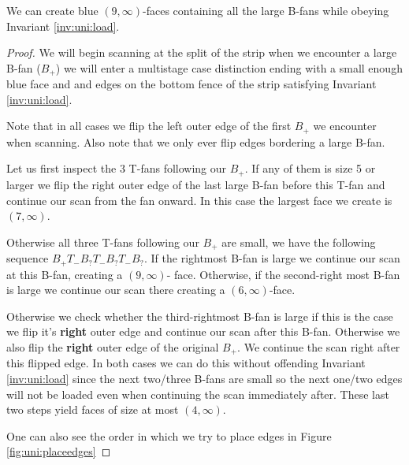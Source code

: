 \begin{lemma}
  \label{lm:uni:removingLargeB-fans}
  We can create blue $(9, \infty)$-faces containing all the large B-fans while obeying Invariant \ref{inv:uni:load}.
\end{lemma}


\begin{proof}
  We will begin scanning at the split of the strip when we encounter a large B-fan ($B_+$) we  will enter a multistage case distinction ending with a small enough blue face and and edges on the bottom fence of the strip satisfying Invariant \ref{inv:uni:load}.

  Note that in all cases we flip the left outer edge of the first $B_+$ we encounter when scanning. Also note that we only ever flip edges bordering a large B-fan.


  Let us first inspect the 3 T-fans following our $B_+$. If any of them is size 5 or larger we flip the right outer edge of the last large B-fan before this T-fan and continue our scan from the fan onward. In this case the largest face we create is $(7, \infty)$.

  Otherwise all three T-fans following our $B_+$ are small, we have the following sequence $B_+ T_- B_? T_- B_? T_- B_?$. If the rightmost B-fan is large we continue our scan at this B-fan, creating a $(9, \infty)$- face. Otherwise, if the second-right most B-fan is large we continue our scan there creating a $(6, \infty)$-face.

  Otherwise we check whether the third-rightmost B-fan is large if this is the case we flip it's \textbf{right} outer edge and continue our scan after this B-fan. Otherwise we also flip the \textbf{right} outer edge of the original $B_+$. We continue the scan right after this flipped edge. In both cases we can do this without offending Invariant \ref{inv:uni:load} since the next two/three B-fans are small so the next one/two edges will not be loaded even when continuing the scan immediately after. These last two steps yield faces of size at most $(4, \infty)$.

  One can also see the order in which we try to place edges in Figure \ref{fig:uni:placeedges}


\end{proof}
